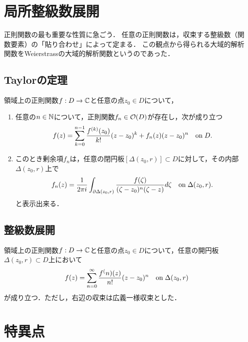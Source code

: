 \documentclass[uplatex, dvipdfmx]{jsreport}
\begin{document}
\section{局所整級数展開}

\begin{tcolorbox}[colframe=ForestGreen, colback=ForestGreen!10!white,breakable,colbacktitle=ForestGreen!40!white,coltitle=black,fonttitle=\bfseries\sffamily,
title=]
    正則関数の最も重要な性質に急ごう．
    任意の正則関数は，収束する整級数（関数要素）の「貼り合わせ」によって定まる．
    この観点から得られる大域的解析関数をWeierstrassの大域的解析関数というのであった．
\end{tcolorbox}

\subsection{Taylorの定理}

\begin{theorem}[Taylorの定理]
    領域上の正則関数$f:D\to\mathbb{C}$と任意の点$z_0\in D$について，
    \begin{enumerate}
        \item 任意の$n\in\mathbb{N}$について，正則関数$f_n\in\mathcal{O}(D)$が存在し，次が成り立つ
        \[f(z)=\sum^{n-1}_{k=0}\frac{f^{(k)}(z_0)}{k!}(z-z_0)^k+f_n(z)(z-z_0)^n\quad\mathrm{on}\; D.\]
        \item このとき剰余項$f_n$は，任意の閉円板$[\Delta(z_0,r)]\subset D$に対して，その内部$\Delta(z_0,r)$上で
        \[f_n(z)=\frac{1}{2\pi i}\int_{\partial\Delta(z_0,r)}\frac{f(\zeta)}{(\zeta-z_0)^n(\zeta-z)}d\zeta\quad\mathrm{on}\;\Delta(z_0,r).\]
        と表示出来る．
    \end{enumerate}
\end{theorem}

\subsection{整級数展開}

\begin{corollary}
    領域上の正則関数$f:D\to\mathbb{C}$と任意の点$z_0\in D$について，任意の開円板$\Delta(z_0,r)\subset D$上において
    \[f(z)=\sum^\infty_{n=0}\frac{f^(n)(z)}{n!}(z-z_0)^n\quad\mathrm{on}\;\Delta(z_0,r)\]
    が成り立つ．ただし，右辺の収束は広義一様収束とした．
\end{corollary}

\section{特異点}
\end{document}
